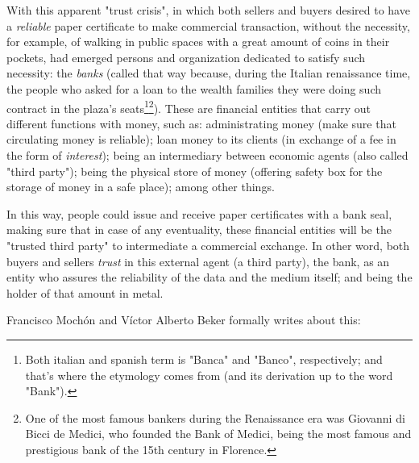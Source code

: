 \documentclass[12pt,a4paper,twoside]{book}
\begin{document}
With this apparent "trust crisis", in which both sellers and buyers desired to have a \textit{reliable} paper certificate to make commercial transaction, without the necessity, for example, of walking in public spaces with a great amount of coins in their pockets, had emerged persons and organization dedicated to satisfy such necessity: the \textit{banks} (called that way because, during the Italian renaissance time, the people who asked for a loan to the wealth families they were doing such contract in the plaza's seats\footnote{Both italian and spanish term is "Banca" and "Banco", respectively; and that's where the etymology comes from (and its derivation up to the word "Bank").}\footnote{One of the most famous bankers during the Renaissance era was Giovanni di Bicci de Medici, who founded the Bank of Medici, being the most famous and prestigious bank of the 15th century in Florence.}). These are financial entities that carry out different functions with money, such as: administrating money (make sure that circulating money is reliable); loan money to its clients (in exchange of a fee in the form of \textit{interest}); being an intermediary between economic agents (also called "third party"); being the physical store of money (offering safety box for the storage of money in a safe place); among other things.

In this way, people could issue and receive paper certificates with a bank seal, making sure that in case of any eventuality, these financial entities will be the "trusted third party" to intermediate a commercial exchange. In other word, both buyers and sellers \textit{trust} in this external agent (a third party), the bank, as an entity who assures the reliability of the data and the medium itself; and being the holder of that amount in metal.

Francisco Mochón and Víctor Alberto Beker formally writes about this:
\end{document}
